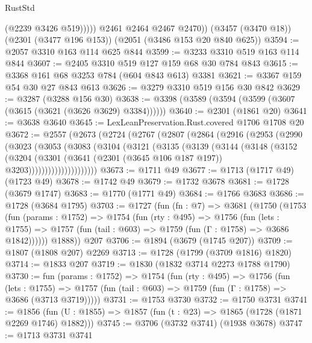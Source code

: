 \begin{lexlean}{RustStd}
\begin{coremodule}
{\begin{coremodule}
{{{{{{{{{{{{{                (@2239 @3426 @519)))))
        @2461
        @2464
        @2467
        @2470))
    (@3457 (@3470 @18))
    (@2301 (@3477 @196 @153))
    (@2051 (@3486 @153 @20 @840 @625))
@3594 := @2057 @3310 @163 @114 @625 @844
@3599 := @3233 @3310 @519 @163 @114 @844
@3607 := @2405 @3310 @519 @127 @159 @68 @30 @784 @843
@3615 := @3368 @161 @68 @3253 @784 (@604 @843 @613) @3381
@3621 := @3367 @159 @54 @30 @27 @843 @613
@3626 := @3279 @3310 @519 @156 @30 @842
@3629 := @3287 (@3288 @156 @30)
@3638 := @3398 (@3589 (@3594 (@3599 (@3607 (@3615 (@3621 (@3626 @3629) @3384))))))
@3640 := @2301 (@1861 @20)
@3641 := @3638 @3640
@3645 := LexLeanPreservation.Rust.covered @1706 @1708 @20
@3672 := @2557
    (@2673
      (@2724
        (@2767
          (@2807
            (@2864
              (@2916
                (@2953
                  (@2990
                    (@3023
                      (@3053
                        (@3083
                          (@3104
                            (@3121
                              (@3135
                                (@3139
                                  (@3144
                                    (@3148
                                      (@3152
                                        (@3204
                                          (@3301
                                            (@3641
                                              (@2301 (@3645 @106 @187 @197))
                                              @3203)))))))))))))))))))))
@3673 := @1711 @49
@3677 := @1713 (@1717 @49) (@1723 @49)
@3678 := @1742 @49
@3679 := @1732 @3678
@3681 := @1728 (@3679 @1747)
@3683 := @1770 (@1771 @49)
@3684 := @1766 @3683
@3686 := @1728 (@3684 @1795)
@3703 := @1727
    (fun (fn : @7) =>
    @3681
      (@1750
        (@1753
          (fun (params : @1752) =>
          @1754
            (fun (rty : @495) =>
            @1756
              (fun (lets : @1755) =>
              @1757 (fun (tail : @603) => @1759 (fun (Γ : @1758) => @3686 @1842))))))
        @1888))
    @207
@3706 := @1894 (@3679 (@1745 @207))
@3709 := @1807 (@1808 @207) @2269
@3713 := @1728 (@1799 (@3709 @1816) @1820)
@3714 := @1833 @207
@3719 := @1830 (@1832 @3714 @2273 @1788 @1790)
@3730 := fun (params : @1752) =>
  @1754
    (fun (rty : @495) =>
    @1756
      (fun (lets : @1755) =>
      @1757 (fun (tail : @603) => @1759 (fun (Γ : @1758) => @3686 (@3713 @3719)))))
@3731 := @1753 @3730
@3732 := @1750 @3731
@3741 := @1856 (fun (U : @1855) => @1857 (fun (t : @23) => @1865 (@1728 (@1871 @2269 @1746) @1882)))
@3745 := @3706 (@3732 @3741) (@1938 @3678)
@3747 := @1713 @3731 @3741
}}}}}}}}}}}}}
\end{coremodule}}
\end{coremodule}
\end{lexlean}
